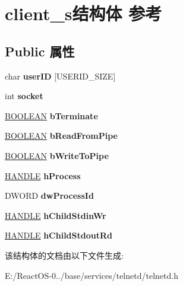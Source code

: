 \hypertarget{structclient__s}{}\section{client\+\_\+s结构体 参考}
\label{structclient__s}
\subsection*{Public 属性}
\begin{DoxyCompactItemize}
\item 
\mbox{\label{structclient__s_ace4b10ad26e8eb7df806b48628295737}} 
char {\bfseries user\+ID} \mbox{[}U\+S\+E\+R\+I\+D\+\_\+\+S\+I\+ZE\mbox{]}
\item 
\mbox{\label{structclient__s_a0f34696da5940411f0cea95634b70b3b}} 
int {\bfseries socket}
\item 
\mbox{\label{structclient__s_a8b45f988961edd3125fac9828bb5dc60}} 
\hyperlink{_processor_bind_8h_a112e3146cb38b6ee95e64d85842e380a}{B\+O\+O\+L\+E\+AN} {\bfseries b\+Terminate}
\item 
\mbox{\label{structclient__s_a17557257d607fe8a3bcaba032e4c3b6a}} 
\hyperlink{_processor_bind_8h_a112e3146cb38b6ee95e64d85842e380a}{B\+O\+O\+L\+E\+AN} {\bfseries b\+Read\+From\+Pipe}
\item 
\mbox{\label{structclient__s_acea4f5e3ce9511118dec47ae28757899}} 
\hyperlink{_processor_bind_8h_a112e3146cb38b6ee95e64d85842e380a}{B\+O\+O\+L\+E\+AN} {\bfseries b\+Write\+To\+Pipe}
\item 
\mbox{\label{structclient__s_a52a0856ed812a3246d18282adde9eef4}} 
\hyperlink{interfacevoid}{H\+A\+N\+D\+LE} {\bfseries h\+Process}
\item 
\mbox{\label{structclient__s_af79fb964bf94ac4909701ef2747dbc86}} 
D\+W\+O\+RD {\bfseries dw\+Process\+Id}
\item 
\mbox{\label{structclient__s_a5297debd2bde19eb6d1e7738bdf7a4f7}} 
\hyperlink{interfacevoid}{H\+A\+N\+D\+LE} {\bfseries h\+Child\+Stdin\+Wr}
\item 
\mbox{\label{structclient__s_ab3d06630635989c29cdd240bc55e1402}} 
\hyperlink{interfacevoid}{H\+A\+N\+D\+LE} {\bfseries h\+Child\+Stdout\+Rd}
\end{DoxyCompactItemize}


该结构体的文档由以下文件生成\+:\begin{DoxyCompactItemize}
\item 
E\+:/\+React\+O\+S-\/0../base/services/telnetd/telnetd.\+h\end{DoxyCompactItemize}
